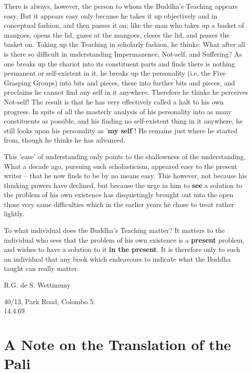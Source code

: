 There is always, however, the person to whom the Buddha's Teaching appears easy. But it appears easy only because he takes it up objectively and in conceptual fashion, and then passes it on; like the man who takes up a basket of mangoes, opens the lid, gazes at the mangoes, closes the lid, and passes the basket on. Taking up the Teaching in scholarly fashion, he thinks: What after all is there so difficult in understanding Impermanence, Not-self, and Suffering? As one breaks up the chariot into its constituent parts and finds there is nothing permanent or self-existent in it, he breaks up the personality (i.e. the Five Grasping Groups) into bits and pieces, these into further bits and pieces, and proclaims he cannot find any self in it anywhere. Therefore he thinks he perceives Not-self! The result is that he has very effectively called a halt to his own progress. In spite of all the masterly analysis of his personality into as many constituents as possible, and his finding no self-existent thing in it anywhere, he still looks upon his personality as '\textbf{my self}'! He remains just where he started from, though he thinks he has advanced.

This 'ease' of understanding only points to the shallowness of the understanding. What a decade ago, pursuing such scholasticism, appeared easy to the present writer -- that he now finds to be by no means easy. This however, not because his thinking powers have declined, but because the urge in him to \textbf{see} a solution to the problem of his own existence has disquietingly brought out into the open those very same difficulties which in the earlier years he chose to treat rather lightly.

To what individual does the Buddha's Teaching matter? It matters to the individual who sees that the problem of his own existence is a \textbf{present} problem, and wishes to have a solution to it \textbf{in the present}. It is therefore only to such an individual that any book which endeavours to indicate what the Buddha taught can really matter.

R.G. de S. Wettimuny

40/13, Park Road, Colombo 5.\\
14.4.69

\hypertarget{_a_note_on_the_translation_of_the_pali}{%
\section{A Note on the Translation of the Pali}\label{_a_note_on_the_translation_of_the_pali}}

